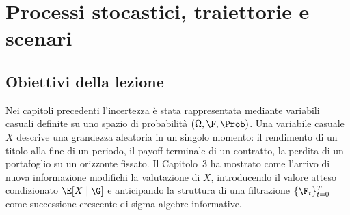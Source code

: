 



\chapter[Processi stocastici]{Processi stocastici, traiettorie e scenari}

\label{cap:processi}

\section{Obiettivi della lezione}

Nei capitoli precedenti l'incertezza \`{e} stata rappresentata mediante
variabili casuali definite su uno spazio di probabilit\`{a}
$(\Omega,\F,\Prob)$. Una variabile casuale $X$ descrive una grandezza
aleatoria in un singolo momento: il rendimento di un titolo alla fine di un
periodo, il payoff terminale di un contratto, la perdita di un portafoglio su
un orizzonte fissato. Il Capitolo~3 ha mostrato come l'arrivo di nuova
informazione modifichi la valutazione di $X$, introducendo il valore atteso
condizionato $\E[X\mid\G]$ e anticipando la struttura di una filtrazione
$\{\F_t\}_{t=0}^{T}$ come successione crescente di sigma-algebre
informative.

